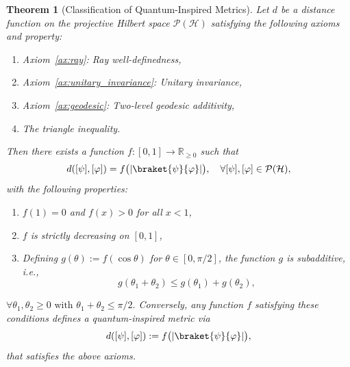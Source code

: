 \documentclass[aps,pra,reprint,nofootinbib,showpacs,superscriptaddress]{revtex4-1}
\newtheorem{theorem}{Theorem}[section]
\newcommand{\Hilbert}{\mathcal{H}}
\newcommand{\Proj}{\mathcal{P}}
\begin{document}
\begin{theorem}[Classification of Quantum-Inspired Metrics]  
\label{thm:classification}  
Let $d$ be a distance function on the projective Hilbert space $\Proj(\Hilbert)$ satisfying the following axioms and property:  
\begin{enumerate}[label=(\roman*)]  
    \item Axiom~\ref{ax:ray}: Ray well-definedness,  
    \item Axiom~\ref{ax:unitary_invariance}: Unitary invariance,  
    \item Axiom~\ref{ax:geodesic}: Two-level geodesic additivity,  
    \item The triangle inequality.  
\end{enumerate}  
Then there exists a function $f:[0,1] \to \mathbb{R}_{\ge 0}$ such that  
\[
d([\psi],[\varphi]) = f\big(|\braket{\psi}{\varphi}|\big), \quad \forall [\psi],[\varphi] \in \Proj(\Hilbert),
\]  
with the following properties:  
\begin{enumerate}[label=(\roman*)]  
    \item $f(1) = 0$ and $f(x) > 0$ for all $x < 1$,  
    \item $f$ is strictly decreasing on $[0,1]$,  
    \item Defining $g(\theta) := f(\cos\theta)$ for $\theta \in [0,\pi/2]$, the function $g$ is subadditive, i.e.,  
    \[
    g(\theta_1 + \theta_2) \le g(\theta_1) + g(\theta_2), 
    \]  
\end{enumerate}  
$\forall \theta_1, \theta_2 \ge 0 \text{ with } \theta_1 + \theta_2 \le \pi/2.$ Conversely, any function $f$ satisfying these conditions defines a quantum-inspired metric via 
\[
d([\psi],[\varphi]) := f\big(|\braket{\psi}{\varphi}|\big),
\] 
that satisfies the above axioms.  
\end{theorem}
\end{document}

